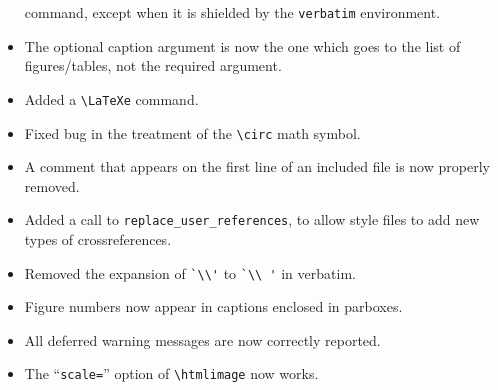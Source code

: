 \begin{changebar}
\begin{htmllist}
\begin{itemize}
\begin{verbatim}
\end{verbatim}
command, except when it is shielded by the \texttt{verbatim}
environment.
\item The optional caption argument is now the one which goes
        to the list of figures/tables, not the required argument.
\item Added a \verb|\LaTeXe| command.
\item Fixed bug in the treatment of the \verb|\circ| math symbol.
\item A comment that appears on the first line of an included file
        is now properly removed.
\item Added a call to \texttt{replace\_user\_references}, to allow
style files to add new types of cross\-ref\-eren\-ces.
\item Removed the expansion of \verb|`\\'| to \verb|`\\ '| in verbatim.
\item Figure numbers now appear in captions enclosed in parboxes.
\item All deferred warning messages are now correctly reported.
\item The ``\texttt{scale=}'' option of \verb|\htmlimage| now works.
\end{itemize}
\end{htmllist}
\end{changebar}
 
